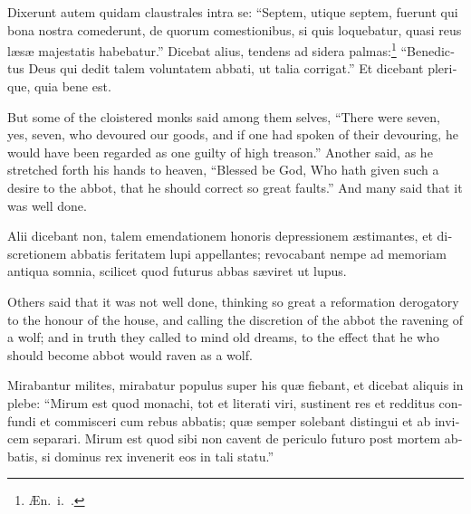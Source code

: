 \documentclass[10pt]{book}
\begin{document}
\begin{paracol}{2}
\switchcolumn*

\begin{otherlanguage}{latin}
Dixerunt autem quidam claustrales intra se: ``Septem, utique septem, fuerunt qui bona nostra comederunt, de quorum comestionibus, si quis loquebatur, quasi reus l\ae{}s\ae{} majestatis habebatur.'' Dicebat alius, tendens ad sidera palmas:\footnote[\textdagger]{\AE{}n.\ i.\ .} ``Benedictus Deus qui dedit talem voluntatem abbati, ut talia corrigat.'' Et dicebant plerique, quia bene est. 
\end{otherlanguage}

\switchcolumn

But some of the cloistered monks said among them selves, ``There were seven, yes, seven, who devoured our goods, and if one had spoken of their devouring, he would have been regarded as one guilty of high treason.'' Another said, as he stretched forth his hands to heaven, ``Blessed be God, Who hath given such a desire to the abbot, that he should correct so great faults.'' And many said that it was well done.

\switchcolumn*

\begin{otherlanguage}{latin}
Alii dicebant non, talem emendationem honoris depressionem \ae{}stimantes, et discretionem abbatis feritatem lupi appellantes; revocabant nempe ad memoriam antiqua somnia, scilicet quod futurus abbas s\ae{}viret ut lupus.
\end{otherlanguage}

\switchcolumn

Others said that it was not well done, thinking so great a reformation derogatory to the honour of the house, and calling the discretion of the abbot the ravening of a wolf; and in truth they called to mind old dreams, to the effect that he who should become abbot would raven as a wolf.

\switchcolumn*

\begin{otherlanguage}{latin}
Mirabantur milites, mirabatur populus super his qu\ae{} fiebant, et dicebat aliquis in plebe: ``Mirum est quod monachi, tot et literati viri, sustinent res et redditus confundi et commisceri cum rebus abbatis; qu\ae{} semper solebant distingui et ab invicem separari. Mirum est quod sibi non cavent de periculo futuro post mortem abbatis, si dominus rex invenerit eos in tali statu.''
\end{otherlanguage}

\switchcolumn


\end{paracol}
\end{document}
